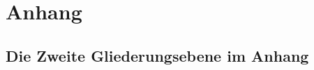 \documentclass[a4paper, 12pt, DIV=11, listof=numbered, numbers=noenddot]{scrartcl}
\begin{document}
	
	
	
	\appendix	%
	\newpage
	
	
	\section{Anhang}
	
	\subsection{Die Zweite Gliederungsebene im Anhang}
	
	
\end{document}
